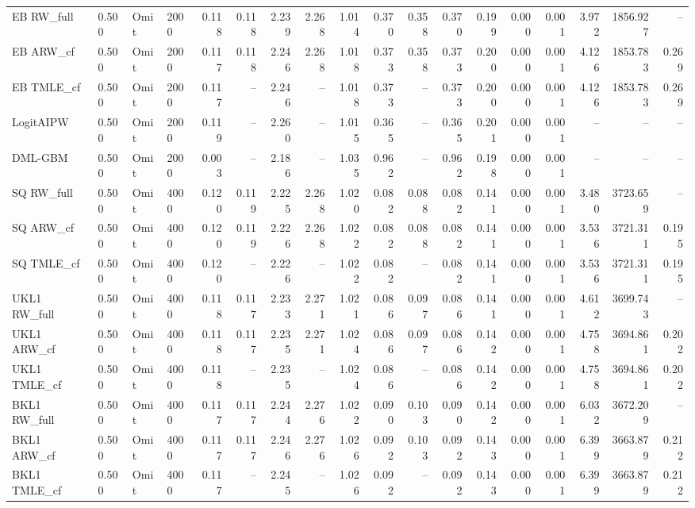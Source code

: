 \begin{tabular}{llllrrrrrrrrrrrrrr}
EB RW\_full & 0.500 & Omit & 2000 & 0.118 & 0.118 & 2.239 & 2.268 & 1.014 & 0.370 & 0.358 & 0.370 & 0.199 & 0.000 & 0.001 & 3.972 & 1856.927 & -- \\
EB ARW\_cf & 0.500 & Omit & 2000 & 0.117 & 0.118 & 2.246 & 2.268 & 1.018 & 0.373 & 0.358 & 0.373 & 0.200 & 0.000 & 0.001 & 4.126 & 1853.783 & 0.269 \\
EB TMLE\_cf & 0.500 & Omit & 2000 & 0.117 & -- & 2.246 & -- & 1.018 & 0.373 & -- & 0.373 & 0.200 & 0.000 & 0.001 & 4.126 & 1853.783 & 0.269 \\
LogitAIPW & 0.500 & Omit & 2000 & 0.119 & -- & 2.260 & -- & 1.015 & 0.365 & -- & 0.365 & 0.201 & 0.000 & 0.001 & -- & -- & -- \\
DML-GBM & 0.500 & Omit & 2000 & 0.003 & -- & 2.186 & -- & 1.035 & 0.962 & -- & 0.962 & 0.198 & 0.000 & 0.001 & -- & -- & -- \\
SQ RW\_full & 0.500 & Omit & 4000 & 0.120 & 0.119 & 2.225 & 2.268 & 1.020 & 0.082 & 0.088 & 0.082 & 0.141 & 0.000 & 0.001 & 3.480 & 3723.659 & -- \\
SQ ARW\_cf & 0.500 & Omit & 4000 & 0.120 & 0.119 & 2.226 & 2.268 & 1.022 & 0.082 & 0.088 & 0.082 & 0.141 & 0.000 & 0.001 & 3.536 & 3721.311 & 0.195 \\
SQ TMLE\_cf & 0.500 & Omit & 4000 & 0.120 & -- & 2.226 & -- & 1.022 & 0.082 & -- & 0.082 & 0.141 & 0.000 & 0.001 & 3.536 & 3721.311 & 0.195 \\
UKL1 RW\_full & 0.500 & Omit & 4000 & 0.118 & 0.117 & 2.233 & 2.271 & 1.021 & 0.086 & 0.097 & 0.086 & 0.141 & 0.000 & 0.001 & 4.612 & 3699.743 & -- \\
UKL1 ARW\_cf & 0.500 & Omit & 4000 & 0.118 & 0.117 & 2.235 & 2.271 & 1.024 & 0.086 & 0.097 & 0.086 & 0.142 & 0.000 & 0.001 & 4.758 & 3694.861 & 0.202 \\
UKL1 TMLE\_cf & 0.500 & Omit & 4000 & 0.118 & -- & 2.235 & -- & 1.024 & 0.086 & -- & 0.086 & 0.142 & 0.000 & 0.001 & 4.758 & 3694.861 & 0.202 \\
BKL1 RW\_full & 0.500 & Omit & 4000 & 0.117 & 0.117 & 2.244 & 2.276 & 1.022 & 0.090 & 0.103 & 0.090 & 0.142 & 0.000 & 0.001 & 6.032 & 3672.209 & -- \\
BKL1 ARW\_cf & 0.500 & Omit & 4000 & 0.117 & 0.117 & 2.246 & 2.276 & 1.026 & 0.092 & 0.103 & 0.092 & 0.143 & 0.000 & 0.001 & 6.399 & 3663.879 & 0.212 \\
BKL1 TMLE\_cf & 0.500 & Omit & 4000 & 0.117 & -- & 2.245 & -- & 1.026 & 0.092 & -- & 0.092 & 0.143 & 0.000 & 0.001 & 6.399 & 3663.879 & 0.212 \\

\end{tabular}
